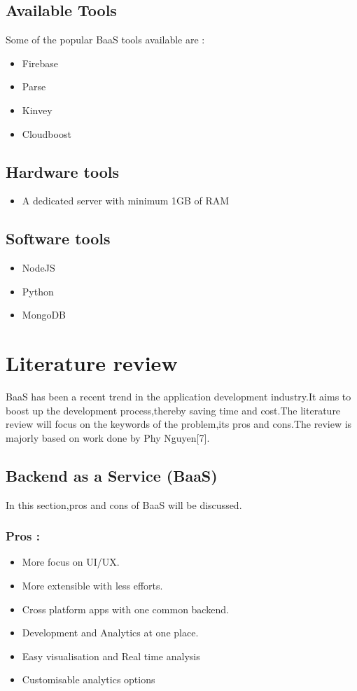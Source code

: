 \documentclass[a4paper,12pt]{report}
\begin{document}
    \subsection{Available Tools}
    Some of the popular BaaS tools available are :
    \begin{itemize}
    \item Firebase
    \item Parse
    \item Kinvey
    \item Cloudboost
    \end{itemize}
    
    \subsection{Hardware tools}    
    \begin{itemize}
    \item A dedicated server with minimum 1GB of RAM
    \end{itemize}

    \subsection{Software tools}    
    \begin{itemize}
    \item NodeJS     
    \item Python
    \item MongoDB
    \end{itemize}
            
    \section{Literature review}
    BaaS has been a recent trend in the application development industry.It aims to boost up the development process,thereby saving time and cost.The literature review will focus on the keywords of the problem,its pros and cons.The review is majorly based on work done by Phy Nguyen[7].
    
    \subsection{Backend as a Service (BaaS)}
    In this section,pros and cons of BaaS will be discussed. \\
    \subsubsection{Pros :}
    \begin{itemize}
      \item More focus on UI/UX.
      \item More extensible with less efforts.
      \item Cross platform apps with one common backend.
      \item Development and Analytics at one place.
      \item Easy visualisation and Real time analysis      
      \item Customisable analytics options      
      \end{itemize}
\end{document}
